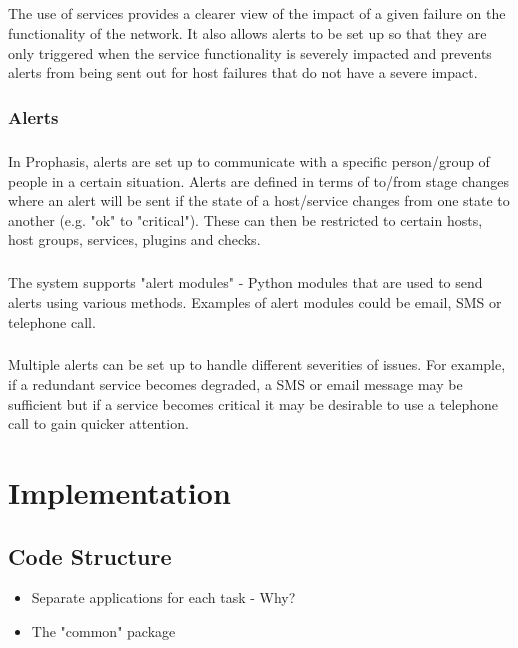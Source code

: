 \documentclass[bsc,logo,twoside]{infthesis}
\begin{document}
\paragraph*{}
	The use of services provides a clearer view of the impact of a given failure
	on the functionality of the network.  It also allows alerts to be set up so
	that they are only triggered when the service functionality is severely
	impacted and prevents alerts from being sent out for host failures that do not
	have a severe impact.

\subsection{Alerts}
\paragraph*{}
	In Prophasis, alerts are set up to communicate with a specific person/group of
	people in a certain situation.  Alerts are defined in terms of to/from stage
	changes where an alert will be sent if the state of a host/service changes
	from one state to another (e.g. "ok" to "critical").  These can then be
	restricted to certain hosts, host groups, services, plugins and checks.
	
\paragraph*{}
	The system supports "alert modules" - Python modules that are used to send
	alerts using various methods.  Examples of alert modules could be email, SMS
	or telephone call.

\paragraph*{}
	Multiple alerts can be set up to handle different severities of issues.  For
	example, if a redundant service becomes degraded, a SMS or email message may
	be sufficient but if a service becomes critical it may be desirable to use
	a telephone call to gain quicker attention.

\chapter{Implementation}
\section{Code Structure}
\begin{itemize}
	\item Separate applications for each task - Why?
	\item The "common" package
\end{itemize}
\end{document}
